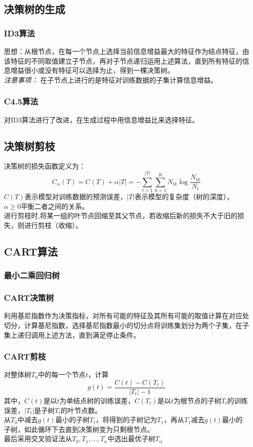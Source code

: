 \documentclass[UTF8]{article}%
\begin{document}
	\subsection{决策树的生成}
	\subsubsection{ID3算法}
	思想：从根节点，在每一个节点上选择当前信息增益最大的特征作为结点特征，由该特征的不同取值建立子节点，再对子节点递归运用上述算法，直到所有特征的信息增益很小或没有特征可以选择为止，得到一棵决策树。\\
	\emph{注意事项： }在子节点上进行的是特征对训练数据的子集计算信息增益。
	\subsubsection{C4.5算法}
	对ID3算法进行了改进，在生成过程中用信息增益比来选择特征。
	\subsection{决策树剪枝}
	决策树的损失函数定义为：
	$$C_\alpha(T)=C(T)+\alpha|T|
	=-\sum_{t=1}^{|T|}\sum_{k=1}^{K}N_{tk}\log\frac{N_{tk}}{N_t}$$
	$C(T)$表示模型对训练数据的预测误差，$|T|$表示模型的复杂度（树的深度），$\alpha\geq0$平衡二者之间的关系。
	\\进行剪枝时,将某一组的叶节点回缩至其父节点，若收缩后新的损失不大于旧的损失，则进行剪枝（收缩）。
	\subsection{CART算法}
	\subsubsection{最小二乘回归树}
	\newpage
	\subsubsection{CART决策树}
	利用基尼指数作为决策指标，对所有可能的特征及其所有可能的取值计算在对应处切分，计算基尼指数，选择基尼指数最小的切分点将训练集划分为两个子集，在子集上递归调用上述方法，直到满足停止条件。
	\subsubsection{CART剪枝}
	对整体树$T_0$中的每一个节点$t$，计算$$g(t)=\frac{C(t)-C(T_t)}{|T_t|-1}$$
	其中，$C(t)$是以$t$为单结点树的训练误差，$C(T_t)$是以$t$为根节点的子树$T_t$的训练误差，$|T_t|$是子树$T_t$的叶节点数。
	\\从$T_0$中减去$g(t)$最小的子树$T_t$，将得到的子树记为$T_1$，再从$T_1$减去$g(t)$最小的子树，如此循环下去直到决策树变为只剩根节点。
	\\最后采用交叉验证法从$T_0,T_1,...,T_n$中选出最优子树$T_\alpha$
	
\end{document}
